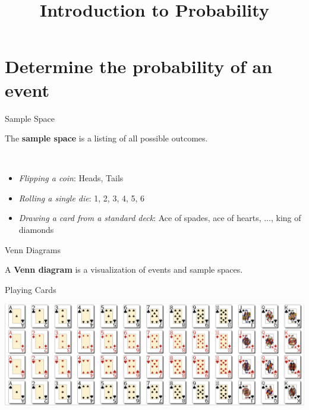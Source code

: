 \documentclass[t]{beamer}
\title{Introduction to Probability}
\author{}
\date{}
\begin{document}
\begin{frame} 
\maketitle
\end{frame}

\section{Determine the probability of an event}

\begin{frame}{Sample Space}
\begin{tcolorbox}[colframe=green!20!black, colback = green!30!white,title=\textbf{Sample Space}]
The \textbf{sample space} is a listing of all possible outcomes.
\end{tcolorbox}
\vspace{6pt} \pause
{} \\
\begin{itemize}
	\item<+->{\emph{Flipping a coin}: Heads, Tails}
	\item<+->{\emph{Rolling a single die}: 1, 2, 3, 4, 5, 6}
	\item<+->{\emph{Drawing a card from a standard deck}: Ace of spades, ace of hearts, $\dots$, king of diamonds}
\end{itemize}
\end{frame}

\begin{frame}{Venn Diagrams}
\begin{tcolorbox}[colframe=green!20!black, colback = green!30!white,title=\textbf{Venn Diagrams}]
A \textbf{Venn diagram} is a visualization of events and sample spaces.
\end{tcolorbox}
\vspace{8pt} \pause
\begin{center}
\end{center}
\end{frame}

\begin{frame}{Playing Cards}
\begin{center}
\includegraphics[scale=0.23]{../Images/Playing_Cards.png}
\end{center}
\end{frame}
\end{document}
